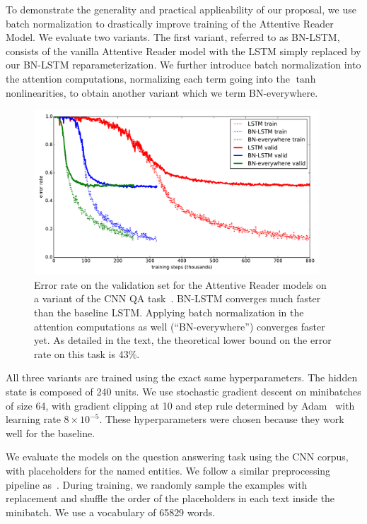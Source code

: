 \documentclass{article} %
\begin{document}
To demonstrate the generality and practical applicability of our proposal,
we use batch normalization to drastically improve training of the Attentive Reader Model.
We evaluate two variants.
The first variant, referred to as BN-LSTM, consists of the vanilla Attentive Reader model with the LSTM simply replaced by our BN-LSTM reparameterization.
We further introduce batch normalization into the attention computations, normalizing each term going into the $\tanh$ nonlinearities, to obtain another variant which we term BN-everywhere.

\begin{figure}[!ht]
\center
\includegraphics[width=0.95\textwidth]{figures/attr_valid.pdf}
\caption{
Error rate on the validation set for the Attentive Reader models on a variant of the CNN QA task~\citep{attentivereader}.
BN-LSTM converges much faster than the baseline LSTM.
Applying batch normalization in the attention computations as well (``BN-everywhere'') converges faster yet.
As detailed in the text, the theoretical lower bound on the error rate on this task is 43\%.
}
\label{fig:attr_valid}
\end{figure}

All three variants are trained using the exact same hyperparameters.
The hidden state is composed of 240 units.
We use stochastic gradient descent on minibatches of size 64,
with gradient clipping at 10 and step rule determined by Adam~\citep{kingma2014adam}
with learning rate $8 \times 10^{-5}$.
These hyperparameters were chosen because they work well for the baseline.

We evaluate the models on the question answering task using the CNN corpus, with placeholders for the named entities. We follow a similar preprocessing pipeline as~\citet{attentivereader}.
During training, we randomly sample the examples with replacement and shuffle the order of the placeholders in each text inside the minibatch.
We use a vocabulary of 65829 words.
\end{document}
